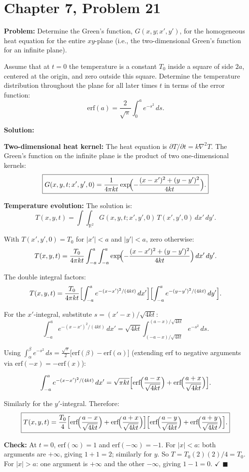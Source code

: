 \documentclass[12pt]{article}
\begin{document}
\section*{Chapter 7, Problem 21}

\textbf{Problem:} Determine the Green's function, $G(x,y;x',y')$, for the homogeneous heat equation for the entire $xy$-plane (i.e., the two-dimensional Green's function for an infinite plane).

Assume that at $t = 0$ the temperature is a constant $T_0$ inside a square of side $2a$, centered at the origin, and zero outside this square. Determine the temperature distribution throughout the plane for all later times $t$ in terms of the error function:
\[
\mathrm{erf}(a) = \frac{2}{\sqrt{\pi}}\int_0^a e^{-s^2}\,ds.
\]

\bigskip
\textbf{Solution:}

\textbf{Two-dimensional heat kernel:} The heat equation is $\partial T/\partial t = k\nabla^2 T$. The Green's function on the infinite plane is the product of two one-dimensional kernels:
\[
\boxed{G(x,y,t;x',y',0) = \frac{1}{4\pi kt}\exp\!\Bigl(-\frac{(x-x')^2 + (y-y')^2}{4kt}\Bigr).}
\]

\textbf{Temperature evolution:} The solution is:
\[
T(x,y,t) = \int\!\!\!\int_{\mathbb{R}^2} G(x,y,t;x',y',0)\,T(x',y',0)\,dx'\,dy'.
\]

With $T(x',y',0) = T_0$ for $|x'| < a$ and $|y'| < a$, zero otherwise:
\[
T(x,y,t) = \frac{T_0}{4\pi kt}\int_{-a}^{a}\int_{-a}^{a}\exp\!\Bigl(-\frac{(x-x')^2+(y-y')^2}{4kt}\Bigr)\,dx'\,dy'.
\]

The double integral factors:
\[
T(x,y,t) = \frac{T_0}{4\pi kt}\Bigl[\int_{-a}^{a}e^{-(x-x')^2/(4kt)}\,dx'\Bigr]\Bigl[\int_{-a}^{a}e^{-(y-y')^2/(4kt)}\,dy'\Bigr].
\]

For the $x'$-integral, substitute $s = (x'-x)/\sqrt{4kt}$:
\[
\int_{-a}^{a}e^{-(x-x')^2/(4kt)}\,dx' = \sqrt{4kt}\int_{(-a-x)/\sqrt{4kt}}^{(a-x)/\sqrt{4kt}}e^{-s^2}\,ds.
\]

Using $\int_\alpha^\beta e^{-s^2}\,ds = \frac{\sqrt{\pi}}{2}\bigl[\mathrm{erf}(\beta) - \mathrm{erf}(\alpha)\bigr]$ (extending $\mathrm{erf}$ to negative arguments via $\mathrm{erf}(-x) = -\mathrm{erf}(x)$):

\[
\int_{-a}^{a}e^{-(x-x')^2/(4kt)}\,dx' = \sqrt{\pi kt}\Bigl[\mathrm{erf}\!\Bigl(\frac{a-x}{\sqrt{4kt}}\Bigr) + \mathrm{erf}\!\Bigl(\frac{a+x}{\sqrt{4kt}}\Bigr)\Bigr].
\]

Similarly for the $y'$-integral. Therefore:
\[
\boxed{T(x,y,t) = \frac{T_0}{4}\Bigl[\mathrm{erf}\!\Bigl(\frac{a-x}{\sqrt{4kt}}\Bigr) + \mathrm{erf}\!\Bigl(\frac{a+x}{\sqrt{4kt}}\Bigr)\Bigr]\Bigl[\mathrm{erf}\!\Bigl(\frac{a-y}{\sqrt{4kt}}\Bigr) + \mathrm{erf}\!\Bigl(\frac{a+y}{\sqrt{4kt}}\Bigr)\Bigr].}
\]

\textbf{Check:} At $t=0$, $\mathrm{erf}(\infty) = 1$ and $\mathrm{erf}(-\infty)=-1$. For $|x|<a$: both arguments are $+\infty$, giving $1+1=2$; similarly for $y$. So $T = T_0(2)(2)/4 = T_0$. For $|x|>a$: one argument is $+\infty$ and the other $-\infty$, giving $1-1=0$. $\checkmark$ $\blacksquare$
\end{document}
